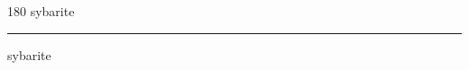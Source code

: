 
\begin{frame}
\begin{center}
\begin{turn}{180}
{\fontsize{2.5cm}{1em}\selectfont sybarite}
\end{turn}
\vspace{1em}\par  
\hrule
\vspace{1em}\par  
{\fontsize{2.5cm}{1em}\selectfont sybarite}
\end{center}
\end{frame}
